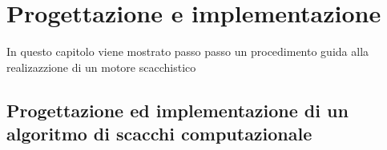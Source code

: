 \chapter{Progettazione e implementazione} %
%

\begin{citazione}
In questo capitolo viene mostrato passo passo un procedimento guida alla realizazzione di un motore scacchistico
\end{citazione}

\newpage


\section{Progettazione ed implementazione di un algoritmo di scacchi computazionale} %


